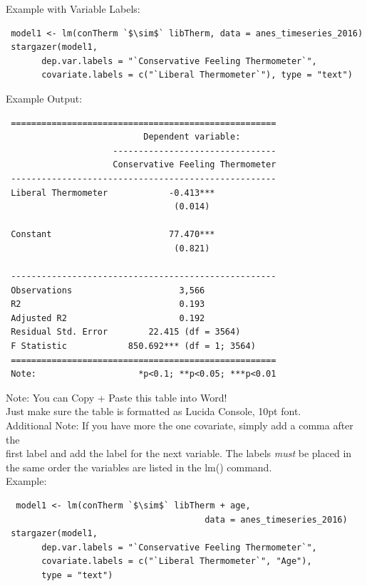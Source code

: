 \documentclass[12pt,letterpaper]{article}
\newcommand{\ind}{\phantom{AA}}
\begin{document}
\begin{tcolorbox}[title = Paper-Ready Tables Example (cont.)]
Example with Variable Labels:
\begin{lstlisting}
 model1 <- lm(conTherm `$\sim$` libTherm, data = anes_timeseries_2016)
 stargazer(model1, 
       dep.var.labels = "`Conservative Feeling Thermometer`", 
       covariate.labels = c("`Liberal Thermometer`"), type = "text")
\end{lstlisting}
Example Output:
\begin{lstlisting}
 ====================================================
                           Dependent variable:       
                     --------------------------------
                     Conservative Feeling Thermometer
 ----------------------------------------------------
 Liberal Thermometer            -0.413***            
                                 (0.014)             
                                                     
 Constant                       77.470***            
                                 (0.821)             
                                                     
 ----------------------------------------------------
 Observations                     3,566              
 R2                               0.193              
 Adjusted R2                      0.192              
 Residual Std. Error        22.415 (df = 3564)       
 F Statistic            850.692*** (df = 1; 3564)    
 ====================================================
 Note:                    *p<0.1; **p<0.05; ***p<0.01
\end{lstlisting}
Note: You can Copy + Paste this table into Word!\\
\ind Just make sure the table is formatted as Lucida Console, 10pt font.\vspace{1em} \\ 
Additional Note: If you have more the one covariate, simply add a comma after the\\ \ind first label and add the label for the next variable. The labels \textit{must} be placed in\\ \ind the same order the variables are listed in the lm() command.\vspace{.5em} \\
Example:
\begin{lstlisting}
  model1 <- lm(conTherm `$\sim$` libTherm + age,  
                                       data = anes_timeseries_2016)
 stargazer(model1, 
       dep.var.labels = "`Conservative Feeling Thermometer`", 
       covariate.labels = c("`Liberal Thermometer`", "Age"), 
       type = "text")
\end{lstlisting}
\end{tcolorbox}
\end{document}

